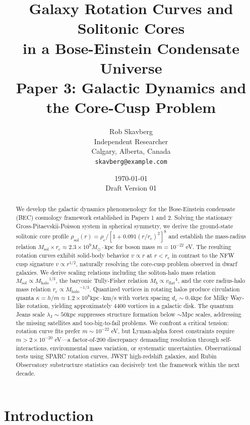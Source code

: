 \documentclass[11pt,a4paper]{article}
\title{\textbf{Galaxy Rotation Curves and Solitonic Cores\\in a Bose-Einstein Condensate Universe}\\[0.5em]
\large Paper 3: Galactic Dynamics and the Core-Cusp Problem}
\author{Rob Skavberg\\[0.3em]
\small Independent Researcher\\
\small Calgary, Alberta, Canada\\
\small \texttt{skavberg@example.com}}
\date{\today\\[0.5em]
\small Draft Version 01}
\newcommand{\Msun}{\ensuremath{M_\odot}}
\newcommand{\Msol}{\ensuremath{M_{\mathrm{sol}}}}
\newcommand{\Mhalo}{\ensuremath{M_{\mathrm{halo}}}}
\newcommand{\kpc}{\ensuremath{\mathrm{kpc}}}
\newcommand{\rc}{\ensuremath{r_{\mathrm{c}}}}
\newcommand{\rhoc}{\ensuremath{\rho_{\mathrm{c}}}}
\newcommand{\vflat}{\ensuremath{v_{\mathrm{flat}}}}
\newcommand{\lambdaJ}{\ensuremath{\lambda_{\mathrm{J}}}}
\theoremstyle{definition}
\theoremstyle{remark}
\begin{document}
\maketitle

\begin{abstract}
We develop the galactic dynamics phenomenology for the Bose-Einstein condensate (BEC) cosmology framework established in Papers 1 and 2. Solving the stationary Gross-Pitaevskii-Poisson system in spherical symmetry, we derive the ground-state solitonic core profile $\rho_{\mathrm{sol}}(r) = \rhoc/[1 + 0.091(r/\rc)^2]^8$ and establish the mass-radius relation $\Msol \times \rc \approx 2.3 \times 10^9 \Msun \cdot \kpc$ for boson mass $m = 10^{-22}$ eV. The resulting rotation curves exhibit solid-body behavior $v \propto r$ at $r < \rc$ in contrast to the NFW cusp signature $v \propto r^{1/2}$, naturally resolving the core-cusp problem observed in dwarf galaxies. We derive scaling relations including the soliton-halo mass relation $\Msol \propto \Mhalo^{1/3}$, the baryonic Tully-Fisher relation $M_b \propto \vflat^4$, and the core radius-halo mass relation $\rc \propto \Mhalo^{-1/3}$. Quantized vortices in rotating halos produce circulation quanta $\kappa = h/m \approx 1.2 \times 10^8 \kpc \cdot \text{km/s}$ with vortex spacing $d_v \sim 0.4 \kpc$ for Milky Way-like rotation, yielding approximately 4400 vortices in a galactic disk. The quantum Jeans scale $\lambdaJ \sim 50 \kpc$ suppresses structure formation below $\sim$Mpc scales, addressing the missing satellites and too-big-to-fail problems. We confront a critical tension: rotation curve fits prefer $m \sim 10^{-22}$ eV, but Lyman-alpha forest constraints require $m > 2 \times 10^{-20}$ eV---a factor-of-200 discrepancy demanding resolution through self-interactions, environmental mass variation, or systematic uncertainties. Observational tests using SPARC rotation curves, JWST high-redshift galaxies, and Rubin Observatory substructure statistics can decisively test the framework within the next decade.
\end{abstract}

\tableofcontents
\newpage

\section{Introduction}
\label{sec:introduction}
\end{document}
